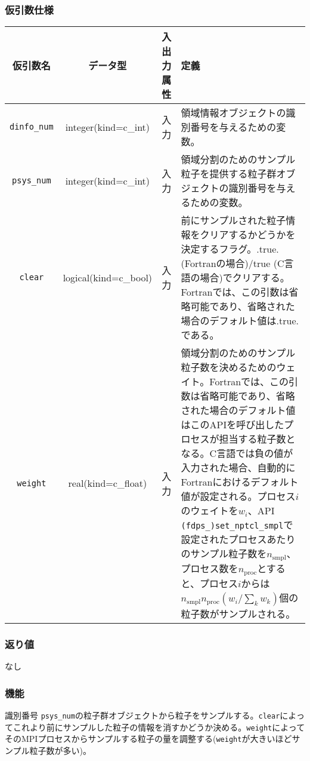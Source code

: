 \subsubsection*{仮引数仕様}
\begin{table}[h]
\begin{tabularx}{\linewidth}{cccX}
\toprule
\rowcolor{Snow2}
仮引数名 & データ型 & 入出力属性 & 定義 \\
\midrule
\texttt{dinfo\_num} & integer(kind=c\_int) & 入力 & 領域情報オブジェクトの識別番号を与えるための変数。\\
\texttt{psys\_num} & integer(kind=c\_int) & 入力 & 領域分割のためのサンプル粒子を提供する粒子群オブジェクトの識別番号を与えるための変数。 \\
\texttt{clear} & logical(kind=c\_bool) & 入力 & 前にサンプルされた粒子情報をクリアするかどうかを決定するフラグ。.true. {\small (Fortranの場合)}/true {\small (C言語の場合)}でクリアする。Fortranでは、この引数は省略可能であり、省略された場合のデフォルト値は.true.である。 \\
\texttt{weight} & real(kind=c\_float) & 入力 & 領域分割のためのサンプル粒子数を決めるためのウェイト。Fortranでは、この引数は省略可能であり、省略された場合のデフォルト値はこのAPIを呼び出したプロセスが担当する粒子数となる。C言語では負の値が入力された場合、自動的にFortranにおけるデフォルト値が設定される。プロセス$i$のウェイトを$w_{i}$、API \texttt{(fdps\_)set\_nptcl\_smpl}で設定されたプロセスあたりのサンプル粒子数を$n_{\mathrm{smpl}}$、プロセス数を$n_{\mathrm{proc}}$とすると、プロセス$i$からは$n_{\mathrm{smpl}}n_{\mathrm{proc}}(w_{i}/\sum_{k} w_{k})$個の粒子数がサンプルされる。\\
\bottomrule
\end{tabularx}
\end{table}

\subsubsection*{返り値}
なし

\subsubsection*{機能}
識別番号 \texttt{psys\_num}の粒子群オブジェクトから粒子をサンプルする。\texttt{clear}によってこれより前にサンプルした粒子の情報を消すかどうか決める。\texttt{weight}によってそのMPIプロセスからサンプルする粒子の量を調整する(\texttt{weight}が大きいほどサンプル粒子数が多い)。

\clearpage

